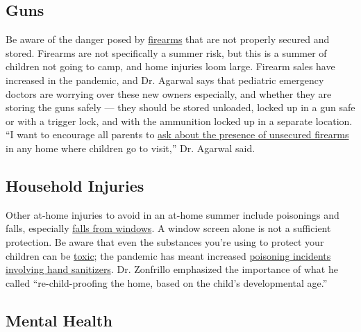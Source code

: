 \hypertarget{guns}{%
\subsection{Guns}\label{guns}}

Be aware of the danger posed by
\href{https://well.blogs.nytimes.com/2013/01/07/keeping-guns-away-from-children/}{firearms}
that are not properly secured and stored. Firearms are not specifically
a summer risk, but this is a summer of children not going to camp, and
home injuries loom large. Firearm sales have increased in the pandemic,
and Dr. Agarwal says that pediatric emergency doctors are worrying over
these new owners especially, and whether they are storing the guns
safely --- they should be stored unloaded, locked up in a gun safe or
with a trigger lock, and with the ammunition locked up in a separate
location. ``I want to encourage all parents to
\href{https://well.blogs.nytimes.com/2016/06/24/ask-well-gun-storage-and-children/}{ask
about the presence of unsecured firearms} in any home where children go
to visit,'' Dr. Agarwal said.

\hypertarget{household-injuries}{%
\subsection{Household Injuries}\label{household-injuries}}

Other at-home injuries to avoid in an at-home summer include poisonings
and falls, especially
\href{https://www.nsc.org/home-safety/safety-topics/child-safety/window-safety\#:~:text=Falls\%20from\%20windows\%20are\%20more,to\%20go\%20to\%20the\%20hospital.}{falls
from windows}. A window screen alone is not a sufficient protection. Be
aware that even the substances you're using to protect your children can
be
\href{https://www.nytimes.com/2020/06/22/health/fda-Eskbiochem-toxic-hand-sanitizer-virus.html?searchResultPosition=1}{toxic};
the pandemic has meant increased
\href{https://www.healthychildren.org/English/health-issues/conditions/COVID-19/Pages/Keep-Hand-Sanitizer-Out-of-Childrens-Reach.aspx\#:~:text=Children\%20and\%20adults\%20also\%20have,after\%20repeated\%20use\%20on\%20skin.}{poisoning
incidents involving hand sanitizers}. Dr. Zonfrillo emphasized the
importance of what he called ``re-child-proofing the home, based on the
child's developmental age.''

\hypertarget{mental-health}{%
\subsection{Mental Health}\label{mental-health}}


